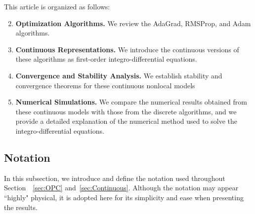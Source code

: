 \documentclass{article} %
\begin{document}
This article is organized as follows:
\begin{enumerate}[label=\textbf{Sec. \arabic*.}, leftmargin=*, align=left, labelsep=0.5em]
    \setcounter{enumi}{1} %
    \item \textbf{Optimization Algorithms.} We review the AdaGrad, RMSProp, and Adam algorithms.
    \item \textbf{Continuous Representations.} We introduce the continuous versions of these algorithms as first-order integro-differential equations.
    \item \textbf{Convergence and Stability Analysis.} We establish stability and convergence theorems for these continuous nonlocal models
    \item \textbf{Numerical Simulations.} We compare the numerical results obtained from these continuous models with those from the discrete algorithms, and we provide a detailed explanation of the numerical method used to solve the integro-differential equations.
\end{enumerate}

\subsection{Notation}
In this subsection, we introduce and define the notation used throughout Section~~\ref{sec:OPC} and~\ref{sec:Continuous}. Although the notation may appear ``highly" physical, it is adopted here for its simplicity and ease when presenting the results.
\end{document}
